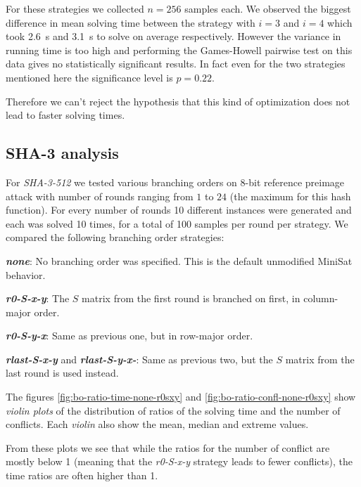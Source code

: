 For these strategies we collected $n=256$ samples each.
We observed the biggest difference in mean solving time between the strategy with $i=3$ and $i=4$ which took \SI{2.6}{\second} and \SI{3.1}{\second} to solve on average respectively.
However the variance in running time is too high and performing the Games-Howell pairwise test on this data gives no statistically significant results.
In fact even for the two strategies mentioned here the significance level is $p=0.22$.

Therefore we can't reject the hypothesis that this kind of optimization does not lead to faster solving times.

\subsection{SHA-3 analysis}
For \emph{SHA-3-512} we tested various branching orders on $8$-bit reference preimage attack with number of rounds ranging from $1$ to $24$ (the maximum for this hash function).
For every number of rounds 10 different instances were generated and each was solved 10 times, for a total of 100 samples per round per strategy.
We compared the following branching order strategies:

\textbf{\emph{none}}: No branching order was specified. This is the default unmodified MiniSat behavior.

\textbf{\emph{r0-S-x-y}}: The $S$ matrix from the first round is branched on first, in column-major order.

\textbf{\emph{r0-S-y-x}}: Same as previous one, but in row-major order.

\textbf{\emph{rlast-S-x-y}} and \textbf{\emph{rlast-S-y-x-}}: Same as previous two, but the $S$ matrix from the last round is used instead.	

The figures \ref{fig:bo-ratio-time-none-r0sxy} and \ref{fig:bo-ratio-confl-none-r0sxy} show \emph{violin plots} of the distribution of ratios of the solving time and the number of conflicts.
Each \emph{violin} also show the mean, median and extreme values.

From these plots we see that while the ratios for the number of conflict are mostly below 1 (meaning that the \emph{r0-S-x-y} strategy leads to fewer conflicts), the time ratios are often higher than 1.

